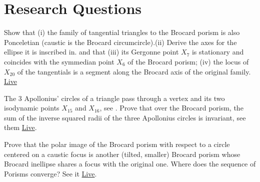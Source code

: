 \section{Research Questions}

\begin{question}
Show that (i) the family of tangential triangles to the Brocard porism is also Ponceletian (caustic is the Brocard circumcircle).(ii) Derive the axes for the ellipse it is inscribed in.  and that (iii) its Gergonne point $X_7$ is stationary and coincides with the symmedian point $X_6$ of the Brocard porism; (iv) the locus of $X_{20}$ of the tangentials is a segment along the Brocard axis of the original family. \href{https://bit.ly/2RpNxdn}{Live} 
\end{question}

\begin{question}
The 3 Apollonius' circles of a triangle pass through a vertex and its two isodynamic points $X_{15}$ and $X_{16}$, see \cite[Isodynamic points]{mw}. Prove that over the Brocard porism, the sum of the inverse squared radii of the three Apollonius circles is invariant, see them \href{https://bit.ly/3elEzXI}{Live}.
\end{question}

\begin{question}
Prove that the polar image of the Brocard porism with respect to a circle centered on a caustic focus is another (tilted, smaller) Brocard porism whose Brocard inellipse shares a focus with the original one. Where does the sequence of Porisms converge? See it \href{https://bit.ly/3b7erOg}{Live}.
\end{question}
